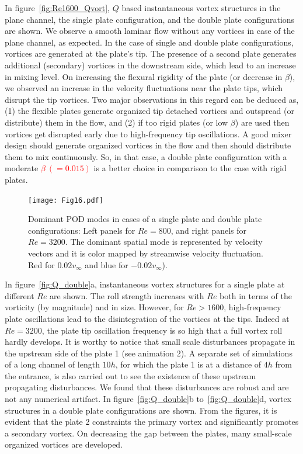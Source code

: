 \documentclass[aps,pre,twocolumn,aps,longbibliography]{revtex4-1}
\begin{document}
	
	In figure~\ref{fig:Re1600_Qvort}, $Q$ based instantaneous vortex structures in the plane channel, the single plate configuration, and the double plate configurations are shown. We observe a smooth laminar flow without any vortices in case of the plane channel, as expected. In the case of single and double plate configurations, vortices are generated at the plate's tip. The presence of a second plate generates additional (secondary) vortices in the downstream side, which lead to an increase in mixing level. On increasing the flexural rigidity of the plate (or decrease in $\beta$), we observed an increase in the velocity fluctuations near the plate tips, which disrupt the tip vortices. Two major observations in this regard can be deduced as, (1) the flexible plates generate organized tip detached vortices and outspread (or distribute) them in the flow, and (2) if too rigid plates (or low $\beta$) are used then vortices get disrupted early due to high-frequency tip oscillations. A good mixer design should generate organized vortices in the flow and then should distribute them to mix continuously. So, in that case, a double plate configuration with a moderate \textcolor{red}{$\beta~(=0.015)$} is a better choice in comparison to the case with rigid plates.
	
	\begin{figure}
		\begin{minipage}[c]{0.85\linewidth}
			\texttt{[image: Fig16.pdf]} 
		\end{minipage} 
		\caption{Dominant POD modes in cases of a single plate and double plate configurations: Left panels for $Re=800$, and right panels for $Re=3200$. The dominant spatial mode is represented by velocity vectors and it is color mapped by streamwise velocity fluctuation. Red for $0.02 {v_{\infty}}$ and blue for $-0.02{v_{\infty}}$).}
		\label{fig:pod_analysis}
	\end{figure}
	
	In figure~\ref{fig:Q_double}a, instantaneous vortex structures for a single plate at different $Re$ are shown. The roll strength increases with $Re$ both in terms of the vorticity (by magnitude) and in size. However, for $Re>1600$, high-frequency plate oscillations lead to the disintegration of the vortices at the tips. Indeed at $Re=3200$, the plate tip oscillation frequency is so high that a full vortex roll hardly develops. It is worthy to notice that small scale disturbances propagate in the upstream side of the plate 1 (see animation 2). A separate set of simulations of a long channel of length $10h$, for which the plate 1 is at a distance of $4h$ from the entrance, is also carried out to see the existence of these upstream propagating disturbances. We found that these disturbances are robust and are not any numerical artifact. In figure~\ref{fig:Q_double}b to~\ref{fig:Q_double}d, vortex structures in a double plate configurations are shown. From the figures, it is evident that the plate 2 constraints the primary vortex and significantly promotes a secondary vortex. On decreasing the gap between the plates, many small-scale organized vortices are developed.
	
\end{document}
